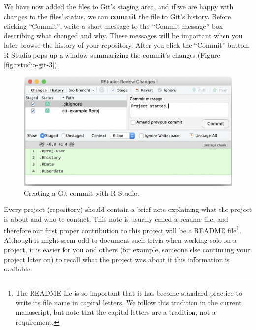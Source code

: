 \documentclass[
  american,
  ,doc,floatsintext]{apa6}
\begin{document}
We have now added the files to Git's staging area, and if we are happy with changes to the files' status, we can \textbf{commit} the file to Git's history. Before clicking \enquote{Commit}, write a short message to the \enquote{Commit message} box describing what changed and why. These messages will be important when you later browse the history of your repository. After you click the \enquote{Commit} button, R Studio pops up a window summarizing the commit's changes (Figure \ref{fig:rstudio-git-3}).

\begin{figure}

{\centering \includegraphics{images/rstudio-git-2} 

}

\caption{Creating a Git commit with R Studio.}\label{fig:rstudio-git-2}
\end{figure}

Every project (repository) should contain a brief note explaining what the project is about and who to contact. This note is usually called a readme file, and therefore our first proper contribution to this project will be a README file\footnote{The README file is so important that it has become standard practice to write its file name in capital letters. We follow this tradition in the current manuscript, but note that the capital letters are a tradition, not a requirement.}. Although it might seem odd to document such trivia when working solo on a project, it is easier for you and others (for example, someone else continuing your project later on) to recall what the project was about if this information is available.
\end{document}
